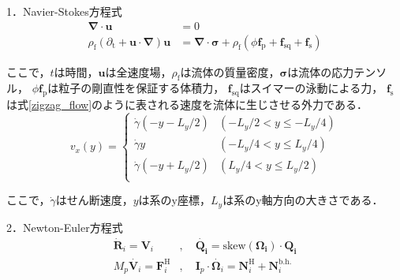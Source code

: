 \documentclass[twocolumns,10pt,a4j]{jarticle}
\begin{document}
\par
1．Navier-Stokes方程式\\
  \vspace{-3truemm}
  \small
  \begin{equation}
    \begin{split}
      \boldsymbol{\nabla}\cdot\boldsymbol{u} &= 0 \\
      \rho_\mathrm{f} \left(\partial_\mathrm{t} + \boldsymbol{u} \cdot \boldsymbol{\nabla} \right) \boldsymbol{u} &= \boldsymbol{\nabla} \cdot \boldsymbol{\sigma} + \rho_\mathrm{f} \left( \phi \boldsymbol{f}_\mathrm{p} + \boldsymbol{f}_\mathrm{sq} + \boldsymbol{f}_\mathrm{s} \right)
    \end{split}
    \label{Navier_Stokes}
  \end{equation}
  \normalsize
  \vspace{-4truemm}

  \noindent
ここで，$t$は時間，$\boldsymbol{u}$は全速度場，$\rho_\mathrm{f}$は流体の質量密度，$\boldsymbol{\sigma}$は流体の応力テンソル，
$\phi \boldsymbol{f}_\mathrm{p}$は粒子の剛直性を保証する体積力，
$\boldsymbol{f}_\mathrm{sq}$はスイマーの泳動による力，
$\boldsymbol{f}_\mathrm{s}$は式\eqref{zigzag_flow}のように表される速度を流体に生じさせる外力である．
  \vspace{-3truemm}
  \small
  \begin{equation}
    v_x(y) =
    \begin{cases}
      \dot{\gamma} (-y - L_y/2) & (-L_y/2 < y \le -L_y/4) \\
      \dot{\gamma} y            & (-L_y/4 < y \le L_y/4) \\
      \dot{\gamma} (-y + L_y/2) & (L_y/4 < y \le L_y/2)\\
    \end{cases}
    \label{zigzag_flow}
  \end{equation}
  \normalsize
  \vspace{-4truemm}

  \noindent
 ここで，$\dot{\gamma}$はせん断速度，$y$は系のy座標，$L_y$は系のy軸方向の大きさである．

  \par
2．Newton-Euler方程式\\
  \vspace{-6truemm}
  \begin{equation}
    \begin{split}
      \dot{\boldsymbol{R}}_i = \boldsymbol{V}_i &, \quad \boldsymbol{\dot{Q_i}} = \mathrm{skew} (\boldsymbol{\Omega_i}) \cdot \boldsymbol{Q_i} \\
      M_p \dot{\boldsymbol{V}_i} = \boldsymbol{F}_i^\mathrm{H} &, \quad
      \boldsymbol{I}_p \cdot \dot{\boldsymbol{\Omega}_i} = \boldsymbol{N}_i^\mathrm{H} + \boldsymbol{N}_i^\mathrm{b.h.}
    \end{split}
    \label{Newton_Euler}
  \end{equation}
  \vspace{-4truemm}
\end{document}

